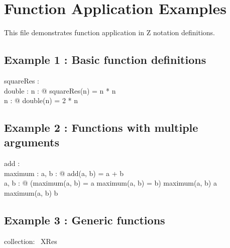 \documentclass[a4paper,10pt,fleqn]{article}
\begin{document}
\section*{Function Application Examples}

\begin{zed}
\end{zed}

\noindent This file demonstrates function application in Z notation definitions.

\bigskip

\subsection*{Example 1 : Basic function definitions}

\begin{axdef}
squareRes : \nat \fun \nat \\
double : \nat \fun \nat
\where
\forall n : \nat @ squareRes(n) = n * n \\
\forall n : \nat @ double(n) = 2 * n
\end{axdef}

\subsection*{Example 2 : Functions with multiple arguments}

\begin{axdef}
add : \nat \cross \nat \fun \nat \\
maximum : \nat \cross \nat \fun \nat
\where
\forall a, b : \nat @ add(a, b) = a + b \\
\forall a, b : \nat @ (maximum(a, b) = a \lor maximum(a, b) = b) \land maximum(a, b) \geq a \land maximum(a, b) \geq b
\end{axdef}

\subsection*{Example 3 : Generic functions}

\begin{gendef}[XRes]
  collection: \seq~XRes
\end{gendef}
\end{document}
